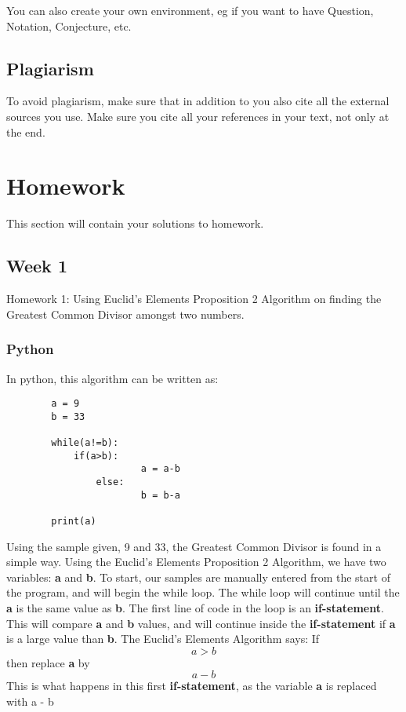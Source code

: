 \documentclass{article}
\theoremstyle{theorem}
\theoremstyle{definition}
\theoremstyle{remark}
\begin{document}
\noindent You can also create your own environment, eg if you want to have Question, Notation, Conjecture, etc.

\subsection{Plagiarism}

To avoid plagiarism, make sure that in addition to \cite{PL} you also cite all the external sources you use. Make sure you cite all your references in your text, not only at the end.

\section{Homework}\label{homework}

This section will contain your solutions to homework. 

\subsection{Week 1}

Homework 1: Using Euclid's Elements Proposition 2 Algorithm on finding the Greatest Common Divisor amongst two numbers.

\subsubsection{Python}
In python, this algorithm can be written as:
\begin{verbatim}
		a = 9
		b = 33

		while(a!=b):
   			if(a>b):
        				a = a-b
    			else:
        				b = b-a
    
		print(a)
\end{verbatim}

Using the sample given, 9 and 33, the Greatest Common Divisor is found in a simple way. Using the Euclid's Elements Proposition 2 Algorithm, we have two variables: \textbf{a} and \textbf{b}. To start, our samples are manually entered from the start of the program, and will begin the while loop. The while loop will continue until the \textbf{a} is the same value as \textbf{b}. The first line of code in the loop is an \textbf{if-statement}. This will compare \textbf{a} and \textbf{b} values, and will continue inside the \textbf{if-statement} if \textbf{a} is a large value than \textbf{b}. The Euclid's Elements Algorithm says: If \[a > b\] then replace \textbf{a} by \[a - b\]This is what happens in this first \textbf{if-statement}, as the variable \textbf{a} is replaced with a - b \medskip\noindent
\medskip\noindent
\end{document}
